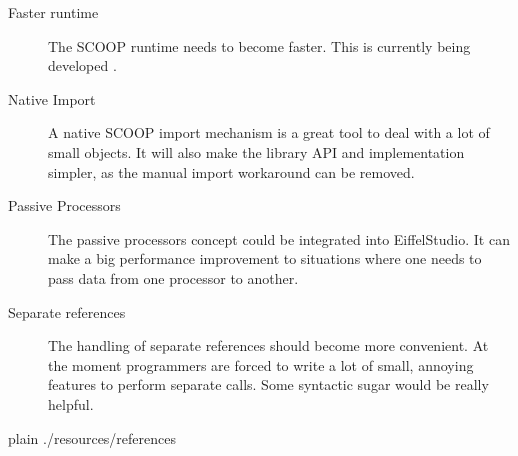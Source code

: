 \documentclass[a4paper,10pt,titlepage]{article}
\begin{document}
\begin{description}
 \item [Faster runtime] The SCOOP runtime needs to become faster. 
 This is currently being developed \cite{thesis:scottwest}.
 \item [Native Import] A native SCOOP import mechanism is a great tool to deal with a lot of small objects.
 It will also make the library API and implementation simpler, as the manual import workaround can be removed.
 \item [Passive Processors] The passive processors concept \cite{paper:passive-processors} could be integrated into EiffelStudio.
 It can make a big performance improvement to situations where one needs to pass data from one processor to another.
 \item [Separate references] The handling of separate references should become more convenient.
 At the moment programmers are forced to write a lot of small, annoying features to perform separate calls.
 Some syntactic sugar would be really helpful.
\end{description}

\newpage
\begin{appendices}



\end{appendices}

\newpage
{}
{}
\begin{flushleft}
{{{
 {plain}
 {./resources/references}
}}}
\end{flushleft}
\end{document}
